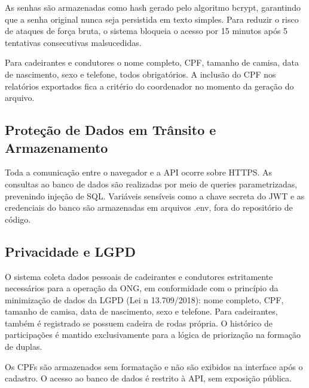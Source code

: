 \documentclass[12pt,a4paper]{article}
\begin{document}
As senhas são armazenadas como hash gerado pelo algoritmo bcrypt, garantindo que a senha original nunca seja persistida em texto simples. Para reduzir o risco de ataques de força bruta, o sistema bloqueia o acesso por 15 minutos após 5 tentativas consecutivas malsucedidas.


Para cadeirantes e condutores o nome completo, CPF, tamanho de camisa, data de nascimento, sexo e telefone, todos obrigatórios.
A inclusão do CPF nos relatórios exportados fica a critério do coordenador no momento da geração do arquivo.


\subsection{Proteção de Dados em Trânsito e Armazenamento}

Toda a comunicação entre o navegador e a API ocorre sobre HTTPS.
As consultas ao banco de dados são realizadas por meio de queries
parametrizadas, prevenindo injeção de SQL. Variáveis sensíveis como a chave
secreta do JWT e as credenciais do banco são armazenadas em arquivos .env, fora do repositório de código.

\subsection{Privacidade e LGPD}

O sistema coleta dados pessoais de cadeirantes e condutores estritamente
necessários para a operação da ONG, em conformidade com o princípio da minimização de dados da LGPD (Lei n\textordmasculine{} 13.709/2018): nome completo, CPF, tamanho de camisa, data de nascimento, sexo e telefone. Para cadeirantes, também é registrado se possuem cadeira de rodas própria. O histórico de participações é mantido exclusivamente para a lógica de priorização na formação de duplas.

Os CPFs são armazenados sem formatação e não são exibidos na interface após o cadastro. O acesso ao banco de dados é restrito à API, sem exposição pública.
\end{document}
